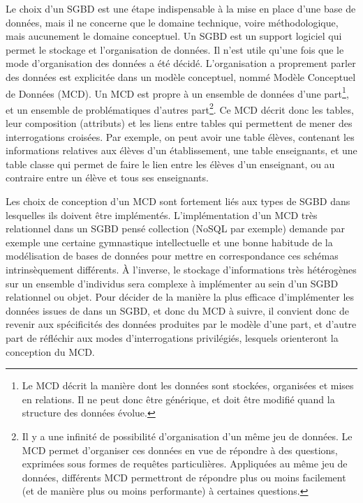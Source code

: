 Le choix d'un SGBD est une étape indispensable à la mise en place d'une base de données, mais il ne concerne que le domaine technique, voire méthodologique, mais aucunement le domaine conceptuel.
Un SGBD est un support logiciel qui permet le stockage et l'organisation de données.
Il n'est utile qu'une fois que le mode d'organisation des données a été décidé.
L'organisation a proprement parler des données est explicitée dans un modèle conceptuel, nommé Modèle Conceptuel de Données (MCD).
Un MCD est propre à un ensemble de données d'une part\footnote{
	Le MCD décrit la manière dont les données sont stockées, organisées et mises en relations.
	Il ne peut donc être générique, et doit être modifié quand la structure des données évolue.
}, et un ensemble de problématiques d'autres part\footnote{
	Il y a une infinité de possibilité d'organisation d'un même jeu de données.
	Le MCD permet d'organiser ces données en vue de répondre à des questions, exprimées sous formes de requêtes particulières.
	Appliquées au même jeu de données, différents MCD permettront de répondre plus ou moins facilement (et de manière plus ou moins performante) à certaines questions.
}.
Ce MCD décrit donc les tables, leur composition (attributs) et les liens entre tables qui permettent de mener des interrogations croisées.
Par exemple, on peut avoir une table élèves, contenant les informations relatives aux élèves d'un établissement, une table enseignants, et une table classe qui permet de faire le lien entre les élèves d'un enseignant, ou au contraire entre un élève et tous ses enseignants.

Les choix de conception d'un MCD sont fortement liés aux types de SGBD dans lesquelles ils doivent être implémentés.
L'implémentation d'un MCD très relationnel dans un SGBD pensé collection (NoSQL par exemple) demande par exemple une certaine gymnastique intellectuelle et une bonne habitude de la modélisation de bases de données pour mettre en correspondance ces schémas intrinsèquement différents.
À l'inverse, le stockage d'informations très hétérogènes sur un ensemble d'individus sera complexe à implémenter au sein d'un SGBD relationnel ou objet.
Pour décider de la manière la plus efficace d'implémenter les données issues de \simfeodal{} dans un SGBD, et donc du MCD à suivre, il convient donc de revenir aux spécificités des données produites par le modèle d'une part, et d'autre part de réfléchir aux modes d'interrogations privilégiés, lesquels orienteront la conception du MCD.


